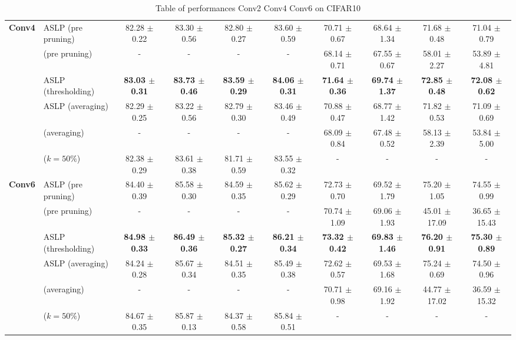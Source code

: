 \begin{table}
{\begin{tabular}{llcccccccc}
       \multirow{6}{*}{\textbf{Conv4}} & ASLP (pre pruning) & 82.28 $\pm$ 0.22 & 83.30 $\pm$ 0.56 & 82.80 $\pm$ 0.27 & 83.60 $\pm$ 0.59 & 70.71 $\pm$ 0.67 & 68.64 $\pm$ 1.34 & 71.68 $\pm$ 0.48 & 71.04 $\pm$ 0.79 \\
        & \cite{DBLP:conf/nips/ZhouLLY19} (pre pruning) & - & - & - & - & 68.14 $\pm$ 0.71 & 67.55 $\pm$ 0.67 & 58.01 $\pm$ 2.27 & 53.89 $\pm$ 4.81 \\
      \cmidrule(lr){2-10}
        & ASLP (thresholding) & \textbf{83.03 $\pm$ 0.31} & \textbf{83.73 $\pm$ 0.46} & \textbf{83.59 $\pm$ 0.29} & \textbf{84.06 $\pm$ 0.31} & \textbf{71.64 $\pm$ 0.36} & \textbf{69.74 $\pm$ 1.37} & \textbf{72.85 $\pm$ 0.48} & \textbf{72.08 $\pm$ 0.62} \\
        & ASLP (averaging)& 82.29 $\pm$ 0.25 & 83.22 $\pm$ 0.56 & 82.79 $\pm$ 0.30 & 83.46 $\pm$ 0.49 & 70.88 $\pm$ 0.47 & 68.77 $\pm$ 1.42 & 71.82 $\pm$ 0.53 & 71.09 $\pm$ 0.69 \\
        & \cite{DBLP:conf/nips/ZhouLLY19} (averaging)& - & - & - & - & 68.09 $\pm$ 0.84 & 67.48 $\pm$ 0.52 & 58.13 $\pm$ 2.39 & 53.84 $\pm$ 5.00 \\
        & \cite{DBLP:conf/cvpr/RamanujanWKFR20} ($k=50\%$) & 82.38 $\pm$ 0.29 & 83.61 $\pm$ 0.38 & 81.71 $\pm$ 0.59 & 83.55 $\pm$ 0.32 & - & - & - & - \\
      \midrule

       \multirow{6}{*}{\textbf{Conv6}} & ASLP (pre pruning) & 84.40 $\pm$ 0.39 & 85.58 $\pm$ 0.30 & 84.59 $\pm$ 0.35 & 85.62 $\pm$ 0.29 & 72.73 $\pm$ 0.70 & 69.52 $\pm$ 1.79 & 75.20 $\pm$ 1.05 & 74.55 $\pm$ 0.99 \\
        & \cite{DBLP:conf/nips/ZhouLLY19} (pre pruning) & - & - & - & - & 70.74 $\pm$ 1.09 & 69.06 $\pm$ 1.93 & 45.01 $\pm$ 17.09 & 36.65 $\pm$ 15.43 \\
      \cmidrule(lr){2-10}
        & ASLP (thresholding) & \textbf{84.98 $\pm$ 0.33} & \textbf{86.49 $\pm$ 0.36} & \textbf{85.32 $\pm$ 0.27} & \textbf{86.21 $\pm$ 0.34} & \textbf{73.32 $\pm$ 0.42} & \textbf{69.83 $\pm$ 1.46} & \textbf{76.20 $\pm$ 0.91} & \textbf{75.30 $\pm$ 0.89} \\
        & ASLP (averaging)& 84.24 $\pm$ 0.28 & 85.67 $\pm$ 0.34 & 84.51 $\pm$ 0.35 & 85.49 $\pm$ 0.38 & 72.62 $\pm$ 0.57 & 69.53 $\pm$ 1.68 & 75.24 $\pm$ 0.69 & 74.50 $\pm$ 0.96 \\
        & \cite{DBLP:conf/nips/ZhouLLY19} (averaging) & - & - & - & - & 70.71 $\pm$ 0.98 & 69.16 $\pm$ 1.92 & 44.77 $\pm$ 17.02 & 36.59 $\pm$ 15.32 \\
        & \cite{DBLP:conf/cvpr/RamanujanWKFR20} ($k=50\%$) & 84.67 $\pm$ 0.35 & 85.87 $\pm$ 0.13 & 84.37 $\pm$ 0.58 & 85.84 $\pm$ 0.51 & - & - & - & - \\
      \bottomrule
    \end{tabular}
  }
  \caption{Table of performances Conv2 Conv4 Conv6 on CIFAR10} 
  
\end{table}



